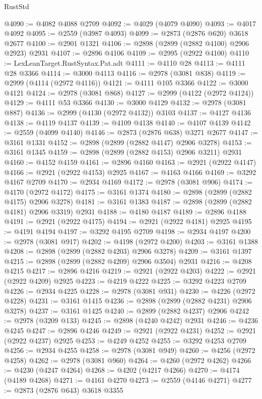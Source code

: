 \begin{lexlean}{RustStd}
\begin{coremodule}
@4090 := @4082 @4088 @2709
@4092 := @4029 (@4079 @4090)
@4093 := @4017 @4092
@4095 := @2559 (@3987 @4093)
@4099 := @2873 (@2876 @620) @3618 @2677
@4100 := @2901 @1321
@4106 := @2898 (@2899 (@2882 @4100) @2906 @2923) @2931
@4107 := @2896 @4106
@4109 := @2995 (@2922 @4100)
@4110 := LexLeanTarget.RustSyntax.Pat.adt
@4111 := @4110 @28
@4113 := @4111 @28 @3366
@4114 := @3000 @4113
@4116 := @2978 (@3081 @838)
@4119 := @2999 (@4114 (@2972 @4116))
@4121 := @4111 @105 @3366
@4122 := @3000 @4121
@4124 := @2978 (@3081 @868)
@4127 := @2999 (@4122 (@2972 @4124))
@4129 := @4111 @53 @3366
@4130 := @3000 @4129
@4132 := @2978 (@3081 @887)
@4136 := @2999 (@4130 (@2972 @4132)) @3103
@4137 := @4127 @4136
@4138 := @4119 @4137
@4139 := @4109 @4138
@4140 := @4107 @4139
@4142 := @2559 (@4099 @4140)
@4146 := @2873 (@2876 @638) @3271 @2677
@4147 := @3161 @1331
@4152 := @2898 (@2899 (@2882 @4147) @2906 @3278)
@4153 := @3161 @1345
@4159 := @2898 (@2899 (@2882 @4153) @2906 @3211) @2931
@4160 := @4152 @4159
@4161 := @2896 @4160
@4163 := @2921 (@2922 @4147)
@4166 := @2921 (@2922 @4153) @2925
@4167 := @4163 @4166
@4169 := @3292 @4167 @2709
@4170 := @2934 @4169
@4172 := @2978 (@3081 @906)
@4174 := @4170 (@2972 @4172)
@4175 := @3161 @1374
@4180 := @2898 (@2899 (@2882 @4175) @2906 @3278)
@4181 := @3161 @1383
@4187 := @2898 (@2899 (@2882 @4181) @2906 @3319) @2931
@4188 := @4180 @4187
@4189 := @2896 @4188
@4191 := @2921 (@2922 @4175)
@4194 := @2921 (@2922 @4181) @2925
@4195 := @4191 @4194
@4197 := @3292 @4195 @2709
@4198 := @2934 @4197
@4200 := @2978 (@3081 @917)
@4202 := @4198 (@2972 @4200)
@4203 := @3161 @1388
@4208 := @2898 (@2899 (@2882 @4203) @2906 @3278)
@4209 := @3161 @1397
@4215 := @2898 (@2899 (@2882 @4209) @2906 @3504) @2931
@4216 := @4208 @4215
@4217 := @2896 @4216
@4219 := @2921 (@2922 @4203)
@4222 := @2921 (@2922 @4209) @2925
@4223 := @4219 @4222
@4225 := @3292 @4223 @2709
@4226 := @2934 @4225
@4228 := @2978 (@3081 @931)
@4230 := @4226 (@2972 @4228)
@4231 := @3161 @1415
@4236 := @2898 (@2899 (@2882 @4231) @2906 @3278)
@4237 := @3161 @1425
@4240 := @2899 (@2882 @4237) @2906
@4242 := @2978 (@3209 @133)
@4245 := @2898 (@4240 @4242) @2931
@4246 := @4236 @4245
@4247 := @2896 @4246
@4249 := @2921 (@2922 @4231)
@4252 := @2921 (@2922 @4237) @2925
@4253 := @4249 @4252
@4255 := @3292 @4253 @2709
@4256 := @2934 @4255
@4258 := @2978 (@3081 @949)
@4260 := @4256 (@2972 @4258)
@4262 := @2978 (@3081 @960)
@4264 := @4260 (@2972 @4262)
@4266 := @4230 (@4247 @4264)
@4268 := @4202 (@4217 @4266)
@4270 := @4174 (@4189 @4268)
@4271 := @4161 @4270
@4273 := @2559 (@4146 @4271)
@4277 := @2873 (@2876 @643) @3618 @3355

\end{coremodule}
\end{lexlean}
